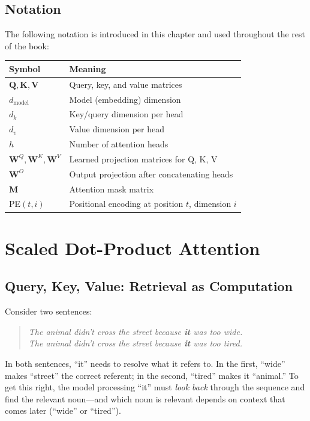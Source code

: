 \subsection*{Notation}

The following notation is introduced in this chapter and used throughout the rest of the book:

\begin{center}
\begin{tabular}{ll}
\toprule
Symbol & Meaning \\
\midrule
$\mathbf{Q}, \mathbf{K}, \mathbf{V}$ & Query, key, and value matrices \\
$d_{\text{model}}$ & Model (embedding) dimension \\
$d_k$ & Key/query dimension per head \\
$d_v$ & Value dimension per head \\
$h$ & Number of attention heads \\
$\mathbf{W}^Q, \mathbf{W}^K, \mathbf{W}^V$ & Learned projection matrices for Q, K, V \\
$\mathbf{W}^O$ & Output projection after concatenating heads \\
$\mathbf{M}$ & Attention mask matrix \\
PE$(t, i)$ & Positional encoding at position $t$, dimension $i$ \\
\bottomrule
\end{tabular}
\end{center}


\section{Scaled Dot-Product Attention}

\subsection{Query, Key, Value: Retrieval as Computation}

Consider two sentences:

\begin{quote}
\emph{The animal didn't cross the street because \textbf{it} was too wide.}\\
\emph{The animal didn't cross the street because \textbf{it} was too tired.}
\end{quote}

In both sentences, ``it'' needs to resolve what it refers to. In the first, ``wide'' makes ``street'' the correct referent; in the second, ``tired'' makes it ``animal.'' To get this right, the model processing ``it'' must \emph{look back} through the sequence and find the relevant noun---and which noun is relevant depends on context that comes later (``wide'' or ``tired'').


